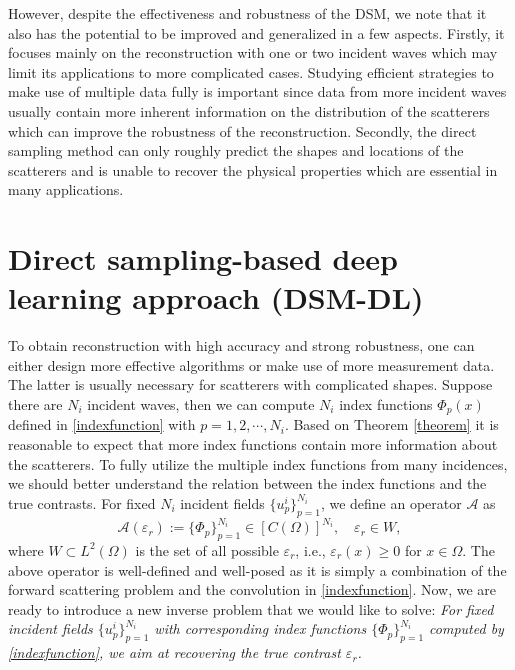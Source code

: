 \documentclass{article}
\begin{document}
However, despite the effectiveness and robustness of the DSM, we note that it also has the potential to be improved and generalized in a few aspects. Firstly, it focuses mainly on the reconstruction with one or two incident waves which may limit its applications to more complicated cases. Studying efficient strategies to make use of multiple data fully is important since data from more incident waves usually contain more inherent information on the distribution of the scatterers which can improve the robustness of the reconstruction. Secondly, the direct sampling method can only roughly predict the shapes and locations of the scatterers and is unable to recover the physical properties which are essential in many applications.
	
\section{Direct sampling-based deep learning approach (DSM-DL)}\label{secDSMDL}
To obtain reconstruction with high accuracy and strong robustness, one can either design more effective algorithms or make use of more measurement data. The latter is usually necessary for scatterers with complicated shapes. Suppose there are $N_{i}$ incident waves, then we can  compute $N_{i}$ index functions $\Phi_{p}(x)$ defined in \eqref{indexfunction} with $p=1,2,\cdots,N_{i}$. Based on Theorem \ref{theorem} it is reasonable to expect that more index functions contain more information about the scatterers. To fully utilize the multiple index functions from many incidences, we should better understand the relation between the index functions and the true contrasts. For fixed $N_{i}$ incident fields $\{u_{p}^{i}\}_{p=1}^{N_{i}}$, we define an operator $\mathcal{A}$ as 
\begin{equation}
		\mathcal{A}(\varepsilon_{r}) :=\{\Phi_{p}\}_{p=1}^{N_{i}}  \in [C(\Omega)]^{N_i}, \quad \varepsilon_{r}\in W,
\end{equation}
where $W \subset L^2(\Omega)$ is the set of all possible $\varepsilon_{r}$, i.e., $\varepsilon_{r}(x)\geq 0 $ for $x\in \Omega$. The above operator is well-defined and well-posed as it is simply a combination of the forward scattering problem and the convolution in \eqref{indexfunction}. Now, we are ready to introduce a new inverse problem that we would like to solve: 
\textit{For fixed incident fields $\{u_{p}^{i}\}_{p=1}^{N_{i}}$ with corresponding index functions $\{\Phi_{p}\}_{p=1}^{N_{i}}$ computed by \eqref{indexfunction}, we aim at recovering the true contrast $\varepsilon_{r}$.}
\end{document}
